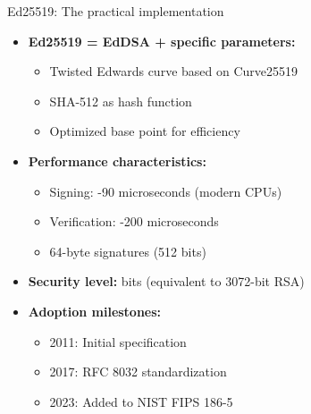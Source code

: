 \documentclass[aspectratio=169, lualatex, handout]{beamer}
\begin{document}
\begin{frame}{Ed25519: The practical implementation}
	\begin{itemize}[<+->]
		\item \textbf{Ed25519 = EdDSA + specific parameters:}
		      \begin{itemize}
			      \item Twisted Edwards curve based on Curve25519
			      \item SHA-512 as hash function
			      \item Optimized base point for efficiency
		      \end{itemize}
		\item \textbf{Performance characteristics:}
		      \begin{itemize}
			      \item Signing: -90 microseconds (modern CPUs)
			      \item Verification: -200 microseconds
			      \item 64-byte signatures (512 bits)
		      \end{itemize}
		\item \textbf{Security level:}  bits (equivalent to 3072-bit RSA)
		\item \textbf{Adoption milestones:}
		      \begin{itemize}
			      \item 2011: Initial specification
			      \item 2017: RFC 8032 standardization
			      \item 2023: Added to NIST FIPS 186-5
		      \end{itemize}
	\end{itemize}
\end{frame}
\end{document}
